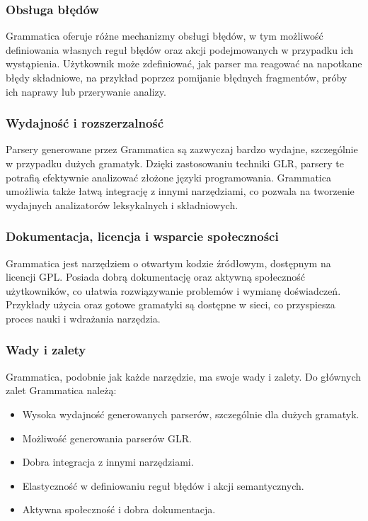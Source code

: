 \documentclass[12pt,twoside]{article}
\begin{document}
\subsubsection{Obsługa błędów}
Grammatica oferuje różne mechanizmy obsługi błędów, w tym możliwość definiowania własnych reguł błędów oraz akcji podejmowanych w przypadku ich wystąpienia. Użytkownik może zdefiniować, jak parser ma reagować na napotkane błędy składniowe, na przykład poprzez pomijanie błędnych fragmentów, próby ich naprawy lub przerywanie analizy.

\subsubsection{Wydajność i rozszerzalność}
Parsery generowane przez Grammatica są zazwyczaj bardzo wydajne, szczególnie w przypadku dużych gramatyk. Dzięki zastosowaniu techniki GLR, parsery te potrafią efektywnie analizować złożone języki programowania. Grammatica umożliwia także łatwą integrację z innymi narzędziami, co pozwala na tworzenie wydajnych analizatorów leksykalnych i składniowych.

\subsubsection{Dokumentacja, licencja i wsparcie społeczności}
Grammatica jest narzędziem o otwartym kodzie źródłowym, dostępnym na licencji GPL. Posiada dobrą dokumentację oraz aktywną społeczność użytkowników, co ułatwia rozwiązywanie problemów i wymianę doświadczeń. Przykłady użycia oraz gotowe gramatyki są dostępne w sieci, co przyspiesza proces nauki i wdrażania narzędzia.

\subsubsection{Wady i zalety}
Grammatica, podobnie jak każde narzędzie, ma swoje wady i zalety. Do głównych zalet Grammatica należą:
\begin{itemize}[label=\textbullet, leftmargin=1.25cm]
   \item Wysoka wydajność generowanych parserów, szczególnie dla dużych gramatyk.
   \item Możliwość generowania parserów GLR.
   \item Dobra integracja z innymi narzędziami.
   \item Elastyczność w definiowaniu reguł błędów i akcji semantycznych.
   \item Aktywna społeczność i dobra dokumentacja.
\end{itemize}
\end{document}

